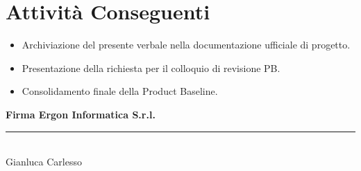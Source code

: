 \documentclass[a4paper, 11pt, oneside]{scrartcl}
\begin{document}
\section{Attività Conseguenti}
\begin{itemize}
    \item Archiviazione del presente verbale nella documentazione ufficiale di progetto.
    \item Presentazione della richiesta per il colloquio di revisione PB.
    \item Consolidamento finale della Product Baseline.
\end{itemize}

\vspace{2cm}
\begin{flushright}
    \textbf{Firma Ergon Informatica S.r.l.} \\[0.5cm]

    \vspace{3cm}
    \rule{6cm}{0.4pt} \\
    \small{Gianluca Carlesso}
\end{flushright}
\end{document}
